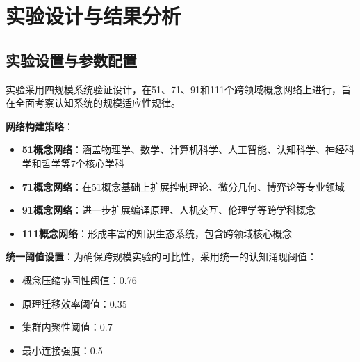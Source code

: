 \documentclass[12pt,a4paper]{article}
\begin{document}


\section{实验设计与结果分析}

\subsection{实验设置与参数配置}

实验采用四规模系统验证设计，在51、71、91和111个跨领域概念网络上进行，旨在全面考察认知系统的规模适应性规律。

\textbf{网络构建策略}：
\begin{itemize}
\item \textbf{51概念网络}：涵盖物理学、数学、计算机科学、人工智能、认知科学、神经科学和哲学等7个核心学科
\item \textbf{71概念网络}：在51概念基础上扩展控制理论、微分几何、博弈论等专业领域
\item \textbf{91概念网络}：进一步扩展编译原理、人机交互、伦理学等跨学科概念
\item \textbf{111概念网络}：形成丰富的知识生态系统，包含跨领域核心概念
\end{itemize}

\textbf{统一阈值设置}：为确保跨规模实验的可比性，采用统一的认知涌现阈值：
\begin{itemize}
\item 概念压缩协同性阈值：0.76
\item 原理迁移效率阈值：0.35  
\item 集群内聚性阈值：0.7
\item 最小连接强度：0.5
\end{itemize}
\end{document}
